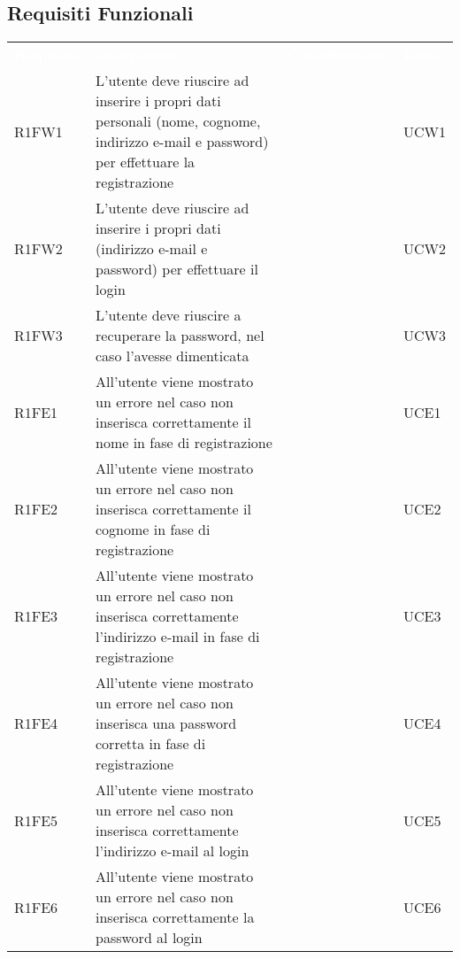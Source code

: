 \subsection{Requisiti Funzionali}


\renewcommand{\arraystretch}{1.5}
\begin{longtable}{ m{}<{\centering}  m{}<{\centering}  m{}<{\centering}  m{}<{\centering}}
	\rowcolor{darkblue}
	\textcolor{white}{\textbf{Requisito}} &\textcolor{white}{\textbf{Descrizione}}& \textcolor{white}{\textbf{Classificazione}} & \textcolor{white}{\textbf{Fonti}}\\ 

	R1FW1 & L’utente deve riuscire ad inserire i propri dati personali (nome, cognome, indirizzo e-mail e password) per effettuare la registrazione & \Ob & UCW1 \\	
	 
	R1FW2 & L’utente deve riuscire ad inserire i propri dati (indirizzo e-mail e password) per effettuare il login & \Ob & UCW2\\	

	R1FW3 & L’utente deve riuscire a recuperare la password, nel caso l’avesse dimenticata & \De & UCW3\\	
	 
	R1FE1 & All’utente viene mostrato un errore nel caso non inserisca correttamente il nome in fase di registrazione & \Ob & UCE1\\	
	 
 	R1FE2 & All’utente viene mostrato un errore nel caso non inserisca correttamente il cognome in fase di registrazione & \Ob & UCE2\\	
	 
	R1FE3 & All’utente viene mostrato un errore nel caso non inserisca correttamente l’indirizzo e-mail in fase di registrazione & \Ob & UCE3\\	

	R1FE4 & All’utente viene mostrato un errore nel caso non inserisca una password corretta in fase di registrazione & \Ob & UCE4\\	
	
	R1FE5 & All'utente viene mostrato un errore nel caso non inserisca correttamente l'indirizzo e-mail al login & \Ob & UCE5 \\
	 
	R1FE6 & All'utente viene mostrato un errore nel caso non inserisca correttamente la password al login & \Ob & UCE6 \\	 
	 

\end{longtable}
